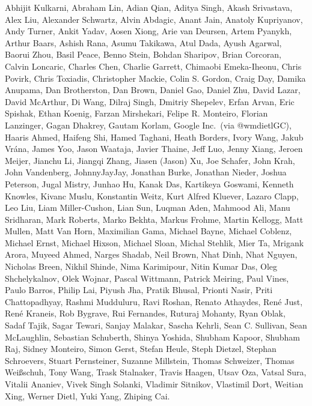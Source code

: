 Abhijit Kulkarni,
Abraham Lin,
Adian Qian,
Aditya Singh,
Akash Srivastava,
Alex Liu,
Alexander Schwartz,
Alvin Abdagic,
Anant Jain,
Anatoly Kupriyanov,
Andy Turner,
Ankit Yadav,
Aosen Xiong,
Arie van Deursen,
Artem Pyanykh,
Arthur Baars,
Ashish Rana,
Asumu Takikawa,
Atul Dada,
Ayush Agarwal,
Baorui Zhou,
Basil Peace,
Benno Stein,
Bohdan Sharipov,
Brian Corcoran,
Calvin Loncaric,
Charles Chen,
Charlie Garrett,
Chimaobi Emeka-Iheonu,
Chris Povirk,
Chris Toxiadis,
Christopher Mackie,
Colin S. Gordon,
Craig Day,
Damika Anupama,
Dan Brotherston,
Dan Brown,
Daniel Gao,
Daniel Zhu,
David Lazar,
David McArthur,
Di Wang,
Dilraj Singh,
Dmitriy Shepelev,
Erfan Arvan,
Eric Spishak,
Ethan Koenig,
Farzan Mirshekari,
Felipe R. Monteiro,
Florian Lanzinger,
Gagan Dhakrey,
Gautam Korlam,
Google Inc.\ (via @wmdietlGC),
Haaris Ahmed,
Haifeng Shi,
Hamed Taghani,
Heath Borders,
Ivory Wang,
Jakub Vr\'ana,
James Yoo,
Jason Waataja,
Javier Thaine,
Jeff Luo,
Jenny Xiang,
Jeroen Meijer,
Jianchu Li,
Jiangqi Zhang,
Jiasen (Jason) Xu,
Joe Schafer,
John Krah,
John Vandenberg,
JohnnyJayJay,
Jonathan Burke,
Jonathan Nieder,
Joshua Peterson,
Jugal Mistry,
Junhao Hu,
Kanak Das,
Kartikeya Goswami,
Kenneth Knowles,
Kivanc Muslu,
Konstantin Weitz,
Kurt Alfred Kluever,
Lazaro Clapp,
Leo Liu,
Liam Miller-Cushon,
Lian Sun,
Luqman Aden,
Mahmood Ali,
Manu Sridharan,
Mark Roberts,
Marko Bekhta,
Markus Frohme,
Martin Kellogg,
Matt Mullen,
Matt Van Horn,
Maximilian Gama,
Michael Bayne,
Michael Coblenz,
Michael Ernst,
Michael Hixson,
Michael Sloan,
Michal Stehlik,
Mier Ta,
Mrigank Arora,
Muyeed Ahmed,
Narges Shadab,
Neil Brown,
Nhat Dinh,
Nhat Nguyen,
Nicholas Breen,
Nikhil Shinde,
Nima Karimipour,
Nitin Kumar Das,
Oleg Shchelykalnov,
Olek Wojnar,
Pascal Wittmann,
Patrick Meiring,
Paul Vines,
Paulo Barros,
Philip Lai,
Piyush Jha,
Pratik Bhusal,
Prionti Nasir,
Priti Chattopadhyay,
Rashmi Mudduluru,
Ravi Roshan,
Renato Athaydes,
Ren\'e Just,
Ren\'e Kraneis,
Rob Bygrave,
Rui Fernandes,
Ruturaj Mohanty,
Ryan Oblak,
Sadaf Tajik,
Sagar Tewari,
Sanjay Malakar,
Sascha Kehrli,
Sean C. Sullivan,
Sean McLaughlin,
Sebastian Schuberth,
Shinya Yoshida,
Shubham Kapoor,
Shubham Raj,
Sidney Monteiro,
Simon Gerst,
Stefan Heule,
Steph Dietzel,
Stephan Schroevers,
Stuart Pernsteiner,
Suzanne Millstein,
Thomas Schweizer,
Thomas Wei\ss schuh,
Tony Wang,
Trask Stalnaker,
Travis Haagen,
Utsav Oza,
Vatsal Sura,
Vitalii Ananiev,
Vivek Singh Solanki,
Vladimir Sitnikov,
Vlastimil Dort,
Weitian Xing,
Werner Dietl,
Yuki Yang,
Zhiping Cai.

